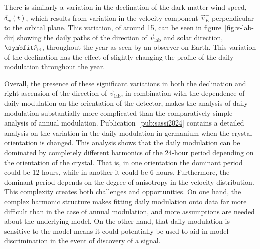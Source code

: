 There is similarly a variation in the declination of the dark matter wind speed, $\delta_w(t)$, which results from variation in the velocity component $\vec{v}_E^\perp$ perpendicular to the orbital plane. This variation, of around 15\degree{}, can be seen in figure~\ref{fig:v-lab-dir} showing the daily paths of the direction of $\vec{v}_\text{lab}$ and solar direction, $\unitv{r}_\odot$, throughout the year as seen by an observer on Earth. This variation of the declination has the effect of slightly changing the profile of the daily modulation throughout the year.

Overall, the presence of these significant variations in both the declination and right ascension of the direction of $\vec{v}_\text{lab}$, in combination with the dependence of daily modulation on the orientation of the detector, makes the analysis of daily modulation substantially more complicated than the comparatively simple analysis of annual modulation. Publication~\ref{pub:sassi2024} contains a detailed analysis on the variation in the daily modulation in germanium when the crystal orientation is changed. This analysis shows that the daily modulation can be dominated by completely different harmonics of the 24-hour period depending on the orientation of the crystal. That is, in one orientation the dominant period could be 12 hours, while in another it could be 6 hours. Furthermore, the dominant period depends on the degree of anisotropy in the velocity distribution. This complexity creates both challenges and opportunities. On one hand, the complex harmonic structure makes fitting daily modulation onto data far more difficult than in the case of annual modulation, and more assumptions are needed about the underlying model. On the other hand, that daily modulation is sensitive to the model means it could potentially be used to aid in model discrimination in the event of discovery of a signal.

